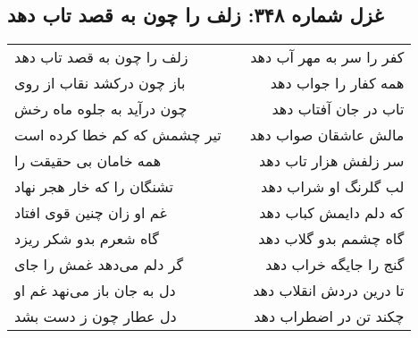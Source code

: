 \begin{center}
\section*{غزل شماره ۳۴۸: زلف را چون به قصد تاب دهد}
\label{sec:348}
\begin{longtable}{l p{0.5cm} r}
زلف را چون به قصد تاب دهد
&&
کفر را سر به مهر آب دهد
\\
باز چون درکشد نقاب از روی
&&
همه کفار را جواب دهد
\\
چون درآید به جلوه ماه رخش
&&
تاب در جان آفتاب دهد
\\
تیر چشمش که کم خطا کرده است
&&
مالش عاشقان صواب دهد
\\
همه خامان بی حقیقت را
&&
سر زلفش هزار تاب دهد
\\
تشنگان را که خار هجر نهاد
&&
لب گلرنگ او شراب دهد
\\
غم او زان چنین قوی افتاد
&&
که دلم دایمش کباب دهد
\\
گاه شعرم بدو شکر ریزد
&&
گاه چشمم بدو گلاب دهد
\\
گر دلم می‌دهد غمش را جای
&&
گنج را جایگه خراب دهد
\\
دل به جان باز می‌نهد غم او
&&
تا درین دردش انقلاب دهد
\\
دل عطار چون ز دست بشد
&&
چکند تن در اضطراب دهد
\\
\end{longtable}
\end{center}
